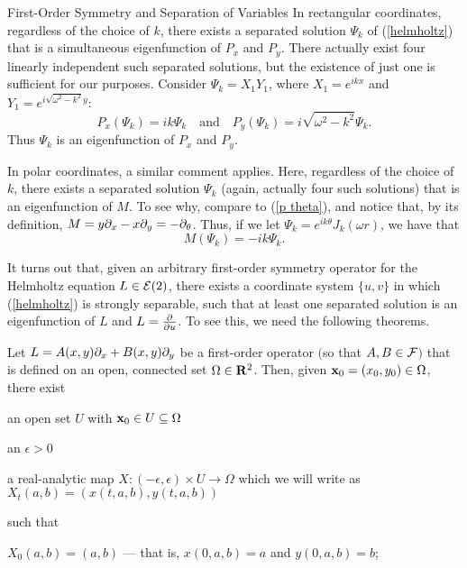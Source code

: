 \begin{section}{First-Order Symmetry and Separation of Variables}
In rectangular coordinates, regardless of the choice of $k$, there exists a separated solution $\Psi_k$ of (\ref{helmholtz}) that is a simultaneous eigenfunction of $P_x$ and $P_y$.  There actually exist four linearly independent such separated solutions, but the existence of just one is sufficient for our purposes.  Consider $\Psi_k = X_1Y_1$, where $X_1 = e^{ikx}$ and $Y_1 = e^{i\sqrt{\omega^2 - k^2}y}$:
\begin{equation}
\label{eigenxy}
P_x \left( \Psi_k \right) = ik \Psi_k
\quad \mbox{and} \quad
P_y \left( \Psi_k \right) = i \sqrt{\omega^2 - k^2} \Psi_k.
\end{equation}
Thus $\Psi_k$ is an eigenfunction of $P_x$ and $P_y$.

In polar coordinates, a similar comment applies.  Here, regardless of the choice of $k$, there exists a separated solution $\Psi_k$ (again, actually four such solutions) that is an eigenfunction of $M$.  To see why, compare to (\ref{p theta}), and notice that, by its definition, $M = y \partial_{x} - x \partial_{y} = -\partial_{\theta}$.  Thus, if we let $\Psi_k = e^{ik\theta}J_k(\omega r)$, we have that
\begin{equation}
\label{eigentheta}
M \left( \Psi_k \right) = -ik \Psi_k.
\end{equation}

It turns out that, given an arbitrary first-order symmetry operator for the Helmholtz equation $L \in \mathcal{E}(2)$, there exists a coordinate system $\{ u,v \}$ in which (\ref{helmholtz}) is strongly separable, such that at least one separated solution is an eigenfunction of $L$ and $L = \frac{\partial }{\partial u}$.  To see this, we need the following theorems.

\begin{theorem}
\label{flow}
Let $L = A(x,y)\partial_{x} + B(x,y)\partial_{y}$ be a first-order operator $($so that $A,B \in \mathcal{F}$$)$ that is defined on an open, connected set $\Omega \in \mathbf{R}^2$.  Then, given $\mathbf{x}_0 = (x_0,y_0) \in \Omega$, there exist

\noindent {} an open set $U$ with $\mathbf{x}_0 \in U \subseteq \Omega$

\noindent {} an $\epsilon > 0$

\noindent {} a real-analytic map $X: (-\epsilon,\epsilon) \times U \longrightarrow \Omega$ which we will write as $X_t(a,b) = (x(t,a,b),y(t,a,b))$

\noindent such that

\noindent {} $X_0(a,b) = (a,b)$ --- that is, $x(0,a,b) = a$ and $y(0,a,b) = b$;


\end{theorem}
\end{section}

